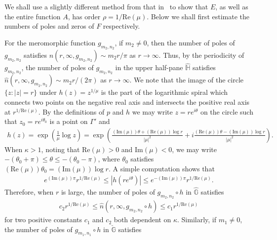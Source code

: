 \documentclass[12pt]{amsart}
\numberwithin{equation}{section}
\begin{document}
We shall use a slightly different method from that in~\cite{Bergweilereremenko2017} to show that $E$, as well as the entire function $A$, has order $\rho=1/\text{Re}(\mu)$. Below we shall first estimate the numbers of poles and zeros of $F$ respectively.

For the meromorphic function $g_{m_2,n_2}$, if $m_2\not=0$, then the number of poles of $g_{m_2,n_2}$ satisfies $n(r,\infty,g_{m_2,n_2})\sim m_2r/\pi$ as $r\to\infty$. Thus, by the periodicity of $g_{m_2,n_2}$, the number of poles of $g_{m_2,n_2}$ in the upper half-pane $\hat{\mathbb{H}}$ satisfies $\hat{n}(r,\infty,g_{m_2,n_2})\sim m_2r/(2\pi)$ as $r\to\infty$. We note that the image of the circle $\{z:|z|=r\}$ under $h(z)=z^{1/\mu}$ is the part of the logarithmic spiral which connects two points on the negative real axis and intersects the positive real axis at $r^{1/\text{Re}(\mu)}$. By the definitions of $p$ and $h$ we may write $z=re^{i\theta}$ on the circle such that $z_0=re^{i\theta_0}$ is a point on $\Gamma'$ and
\begin{equation*}%
\begin{split}
h(z)=\exp\left(\frac{1}{\mu}\log z\right)=\exp\left(\frac{(\text{Im}(\mu)) \theta+(\text{Re}(\mu))\log r}{|\mu|^2}+i\frac{(\text{Re}(\mu))\theta-(\text{Im}(\mu))\log r}{|\mu|^2}\right).
\end{split}
\end{equation*}
When $\kappa>1$, noting that $\text{Re}(\mu)>0$ and $\text{Im}(\mu)<0$, we may write $-(\theta_0+\pi)\leq \theta\leq -(\theta_0-\pi)$, where $\theta_0$ satisfies $(\text{Re}(\mu))\theta_0=(\text{Im}(\mu)) \log r$. A simple computation shows that
\begin{equation}\label{recuree1pm47}
\begin{split}
e^{(\text{Im}(\mu))\pi}r^{1/\text{Re}(\mu)}\leq |h(re^{i\theta})|\leq e^{-(\text{Im}(\mu))\pi}r^{1/\text{Re}(\mu)}.
\end{split}
\end{equation}
Therefore, when $r$ is large, the number of poles of $g_{m_2,n_2}\circ h$ in $\hat{\mathbb{G}}$ satisfies
\begin{equation*}%
\begin{split}
c_2r^{1/\text{Re}(\mu)} \leq \hat{n}(r,\infty,g_{m_2,n_2}\circ h)\leq c_1r^{1/\text{Re}(\mu)}
\end{split}
\end{equation*}
for two positive constants $c_1$ and $c_2$ both dependent on $\kappa$. Similarly, if $m_1\not=0$, the number of poles of $g_{m_1,n_1}\circ h$ in $\check{\mathbb{G}}$ satisfies
\end{document}
